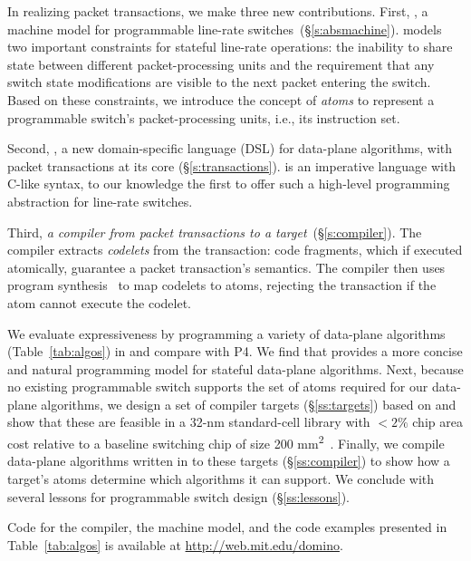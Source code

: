 In realizing packet transactions, we make three new contributions.  First, {\em
\absmachine}, a machine model for programmable line-rate
switches~(\S\ref{s:absmachine}).  \absmachine models two important constraints
for stateful line-rate operations: the inability to share state between different
packet-processing units and the requirement that any switch state
modifications are visible to the next packet entering the switch. Based on
these constraints, we introduce the concept of {\em atoms} to represent a
programmable switch's packet-processing units, i.e., its instruction set.

Second, {\em \pktlanguage{}}, a new domain-specific language (DSL) for
data-plane algorithms, with packet transactions at its core
(\S\ref{s:transactions}).  \pktlanguage is an imperative language with C-like
syntax, to our knowledge the first to offer such a high-level programming
abstraction for line-rate switches.

Third, {\em a compiler from \pktlanguage packet transactions to a \absmachine
target}~(\S\ref{s:compiler}). The \pktlanguage compiler extracts {\em codelets}
from the transaction: code fragments, which if executed atomically, guarantee a
packet transaction's semantics. The compiler then uses program
synthesis~\cite{sketch_asplos} to map codelets to atoms, rejecting the
transaction if the atom cannot execute the codelet.


We evaluate expressiveness by programming a variety of data-plane algorithms
(Table~\ref{tab:algos}) in \pktlanguage and compare with P4. We find that
\pktlanguage provides a more concise and natural programming model for stateful
data-plane algorithms.  Next, because no existing programmable switch supports
the set of atoms required for our data-plane algorithms, we design a set of
compiler targets (\S\ref{ss:targets}) based on \absmachine and show that these
are feasible in a 32-nm standard-cell library with $< 2\%$ chip area cost
relative to a baseline switching chip of size 200
\si{\milli\metre\squared}~\cite{gibb_parsing}.  Finally, we compile data-plane
algorithms written in \pktlanguage to these targets (\S\ref{ss:compiler}) to
show how a target's atoms determine which algorithms it can support. We
conclude with several lessons for programmable switch design
(\S\ref{ss:lessons}).

Code for the \pktlanguage compiler, the \absmachine machine model, and the code
examples presented in Table~\ref{tab:algos} is available at
\url{http://web.mit.edu/domino}.
